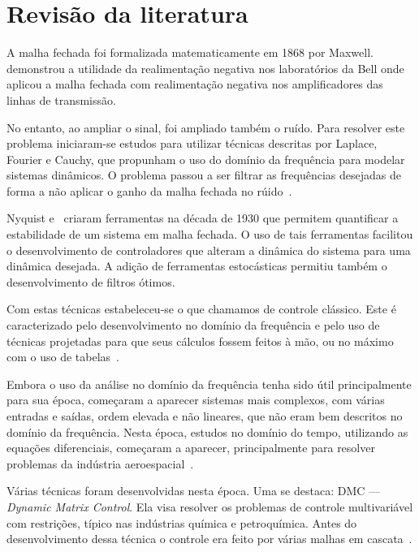
\chapter{Revisão da literatura}%
\label{chp:bibliography-review}

A malha fechada foi formalizada matematicamente em 1868 por Maxwell.
\textcite{article:black} demonstrou a utilidade da realimentação negativa nos
laboratórios da Bell onde aplicou a malha fechada com realimentação negativa nos
amplificadores das linhas de transmissão.

No entanto, ao ampliar o sinal, foi ampliado também o ruído. Para resolver este
problema iniciaram-se estudos para utilizar técnicas descritas por Laplace,
Fourier e Cauchy, que propunham o uso do domínio da frequência para modelar
sistemas dinâmicos. O problema passou a ser filtrar as frequências desejadas de
forma a não aplicar o ganho da malha fechada no rúido~\cite{book:bryson}.

Nyquist e~\textcite{article:bode} criaram ferramentas na década de 1930 que
permitem quantificar a estabilidade de um sistema em malha fechada. O uso de
tais ferramentas facilitou o desenvolvimento de controladores que alteram a
dinâmica do sistema para uma dinâmica desejada. A adição de ferramentas
estocásticas permitiu também o desenvolvimento de filtros ótimos.

Com estas técnicas estabeleceu-se o que chamamos de controle clássico. Este é
caracterizado pelo desenvolvimento no domínio da frequência e pelo uso de
técnicas projetadas para que seus cálculos fossem feitos à mão, ou no máximo com
o uso de tabelas~\cite{book:dorf}.

Embora o uso da análise no domínio da frequência tenha sido útil principalmente
para sua época, começaram a aparecer sistemas mais complexos, com várias
entradas e saídas, ordem elevada e não lineares, que não eram bem descritos no
domínio da frequência. Nesta época, estudos no domínio do tempo, utilizando as
equações diferenciais, começaram a aparecer, principalmente para resolver
problemas da indústria aeroespacial~\cite{article:lyapunov}.

Várias técnicas foram desenvolvidas nesta época. Uma se destaca: \ac{DMC} ---
\textit{Dynamic Matrix Control}. Ela visa resolver os problemas de controle
multivariável com restrições, típico nas indústrias química e petroquímica.
Antes do desenvolvimento dessa técnica o controle era feito por várias malhas em
cascata~\cite{article:cutler}.

